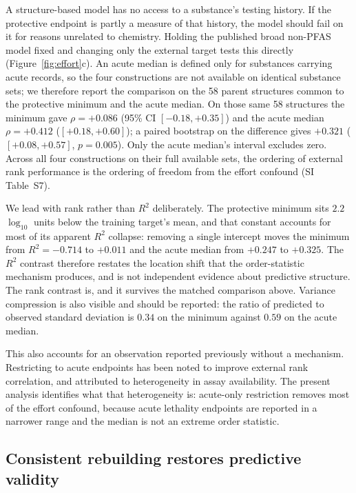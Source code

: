 \documentclass[preprint,12pt]{elsarticle}
\begin{document}
A structure-based model has no access to a substance's testing history. If the
protective endpoint is partly a measure of that history, the model should fail
on it for reasons unrelated to chemistry. Holding the published broad non-PFAS
model fixed and changing only the external target tests this directly
(Figure~\ref{fig:effort}c). An acute median is defined only for substances
carrying acute records, so the four constructions are not available on identical
substance sets; we therefore report the comparison on the 58 parent structures
common to the protective minimum and the acute median. On those same 58
structures the minimum gave $\rho=+0.086$ (95\% CI $[-0.18,+0.35]$) and the
acute median $\rho=+0.412$ ($[+0.18,+0.60]$); a paired bootstrap on the
difference gives $+0.321$ ($[+0.08,+0.57]$, $p=0.005$). Only the acute median's
interval excludes zero. Across all four constructions on their full available
sets, the ordering of external rank performance is the ordering of freedom from
the effort confound (SI Table~S7).

We lead with rank rather than $R^2$ deliberately. The protective minimum sits
$2.2$ $\log_{10}$ units below the training target's mean, and that constant
accounts for most of its apparent $R^2$ collapse: removing a single intercept
moves the minimum from $R^2=-0.714$ to $+0.011$ and the acute median from
$+0.247$ to $+0.325$. The $R^2$ contrast therefore restates the location shift
that the order-statistic mechanism produces, and is not independent evidence
about predictive structure. The rank contrast is, and it survives the matched
comparison above. Variance compression is also visible and should be reported:
the ratio of predicted to observed standard deviation is $0.34$ on the minimum
against $0.59$ on the acute median.

This also accounts for an observation reported previously without a mechanism.
Restricting to acute endpoints has been noted to improve external rank
correlation, and attributed to heterogeneity in assay availability. The present
analysis identifies what that heterogeneity is: acute-only restriction removes
most of the effort confound, because acute lethality endpoints are reported in a
narrower range and the median is not an extreme order statistic.

\subsection{Consistent rebuilding restores predictive validity}
\end{document}
